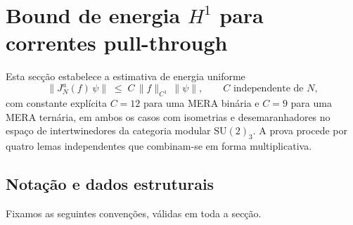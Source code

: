 %
%

\section{Bound de energia $H^1$ para correntes pull-through}
\label{sec:bound_H1}

Esta secção estabelece a estimativa de energia uniforme
\begin{equation}
  \|J_N^a(f)\,\psi\| \;\le\; C\,\|f\|_{C^1}\,\|\psi\|,
  \qquad C \text{ independente de } N,
  \label{eq:bound_H1_master}
\end{equation}
com constante explícita $C = 12$ para uma MERA binária e $C = 9$ para
uma MERA ternária, em ambos os casos com isometrias e desemaranhadores
no espaço de intertwinedores da categoria modular $\mathrm{SU}(2)_3$.
A prova procede por quatro lemas independentes que combinam-se em
forma multiplicativa.

\subsection{Notação e dados estruturais}

Fixamos as seguintes convenções, válidas em toda a secção.

